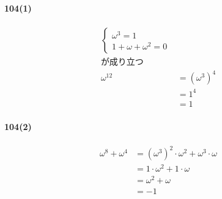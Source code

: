 \documentclass[fleqn,a4j,dvipdfmx,uplatex,twocolumn]{jsarticle}
\begin{document}
\paragraph{104(1)}
\begin{align*}
  \begin{cases} \omega^{3}=1 \\ 1+\omega+\omega^{2}=0 \end{cases} \\
  \text{が成り立つ} \\
  \omega^{12} &= (\omega^3)^4 \\
  &= 1^4 \\
  &= 1
\end{align*}

\paragraph{104(2)}
\begin{align*}
  \omega^{8}+\omega^{4} &= (\omega^{3})^{2} \cdot \omega^{2} + \omega^{3} \cdot \omega \\
  &= 1 \cdot \omega^{2}+1 \cdot \omega \\
  &= \omega^{2}+\omega \\
  &= -1
\end{align*}
\end{document}
